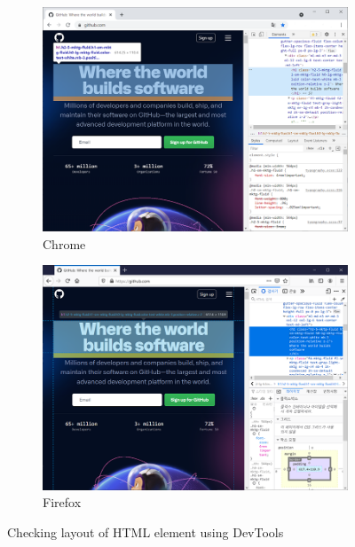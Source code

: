 \begin{figure}[htb]\vspace{10pt}\centering
    \begin{subfigure}{.47\textwidth}\centering
        \includegraphics[width=\textwidth]{images/css-designing-html/chrome-devtools-layout.png}
        \caption{Chrome}
        \label{fig:devtools-chrome}
    \end{subfigure}
    \begin{subfigure}{.47\textwidth}\centering
        \includegraphics[width=\textwidth]{images/css-designing-html/firefox-devtools-layout.png}
        \caption{Firefox}
        \label{fig:devtools-firefox}
    \end{subfigure}
    \caption{Checking layout of HTML element using DevTools}
    \label{fig:devtools-layout}
\end{figure}

